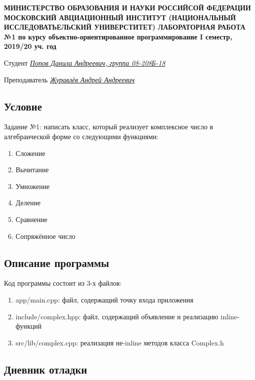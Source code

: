 \documentclass[12pt]{article}
\begin{document}
\begin{titlepage}
\begin{center}
\textbf{МИНИСТЕРСТВО ОБРАЗОВАНИЯ И НАУКИ РОССИЙСОЙ ФЕДЕРАЦИИ
\medskip
МОСКОВСКИЙ АВЦИАЦИОННЫЙ ИНСТИТУТ
(НАЦИОНАЛЬНЫЙ ИССЛЕДОВАТЬЕЛЬСКИЙ УНИВЕРСТИТЕТ)
\vfill\vfill
{\Huge ЛАБОРАТОРНАЯ РАБОТА №1} 
по курсу объектно-ориентированное программирование
I семестр, 2019/20 уч. год}
\end{center}
\vfill

Студент \uline{\it {Попов Данила Андреевич, группа 08-208Б-18}\hfill}

Преподаватель \uline{\it {Журавлёв Андрей Андреевич}\hfill}

\vfill
\end{titlepage}

\subsection*{Условие}

Задание №1: написать класс, который реализует комплексное число в алгебраической форме со следующими функциями: 
\begin{enumerate}
\item Сложение
\item Вычитание
\item Умножение 
\item Деление
\item Сравнение
\item Сопряжённое число
\end{enumerate}

\subsection*{Описание программы}

Код программы состоит из 3-х файлов:
\begin{enumerate}
\item app/main.cpp: файл, содержащий точку входа приложения
\item include/complex.hpp: файл, содержащий объявление и реализацию inline-функций
\item src/lib/complex.cpp: реализация не-inline методов класса Complex.h
\end{enumerate}

\subsection*{Дневник отладки}
\end{document}
